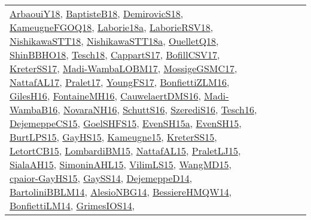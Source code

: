 {\begin{longtable}{lp{3cm}>{\raggedright}p{6cm}>{\raggedright}p{6cm}p{8cm}}
\href{papers/ArbaouiY18.pdf}{ArbaouiY18}\cite{ArbaouiY18}, \href{articles/BaptisteB18.pdf}{BaptisteB18}\cite{BaptisteB18}, \href{papers/DemirovicS18.pdf}{DemirovicS18}\cite{DemirovicS18}, \href{papers/KameugneFGOQ18.pdf}{KameugneFGOQ18}\cite{KameugneFGOQ18}, \href{papers/Laborie18a.pdf}{Laborie18a}\cite{Laborie18a}, \href{articles/LaborieRSV18.pdf}{LaborieRSV18}\cite{LaborieRSV18}, \href{papers/NishikawaSTT18.pdf}{NishikawaSTT18}\cite{NishikawaSTT18}, \href{papers/NishikawaSTT18a.pdf}{NishikawaSTT18a}\cite{NishikawaSTT18a}, \href{papers/OuelletQ18.pdf}{OuelletQ18}\cite{OuelletQ18}, \href{articles/ShinBBHO18.pdf}{ShinBBHO18}\cite{ShinBBHO18}, \href{papers/Tesch18.pdf}{Tesch18}\cite{Tesch18}, \href{papers/CappartS17.pdf}{CappartS17}\cite{CappartS17}, \href{papers/BofillCSV17.pdf}{BofillCSV17}\cite{BofillCSV17}, \href{articles/KreterSS17.pdf}{KreterSS17}\cite{KreterSS17}, \href{papers/Madi-WambaLOBM17.pdf}{Madi-WambaLOBM17}\cite{Madi-WambaLOBM17}, \href{papers/MossigeGSMC17.pdf}{MossigeGSMC17}\cite{MossigeGSMC17}, \href{articles/NattafAL17.pdf}{NattafAL17}\cite{NattafAL17}, \href{papers/Pralet17.pdf}{Pralet17}\cite{Pralet17}, \href{papers/YoungFS17.pdf}{YoungFS17}\cite{YoungFS17}, \href{papers/BonfiettiZLM16.pdf}{BonfiettiZLM16}\cite{BonfiettiZLM16}, \href{papers/GilesH16.pdf}{GilesH16}\cite{GilesH16}, \href{papers/FontaineMH16.pdf}{FontaineMH16}\cite{FontaineMH16}, \href{papers/CauwelaertDMS16.pdf}{CauwelaertDMS16}\cite{CauwelaertDMS16}, \href{papers/Madi-WambaB16.pdf}{Madi-WambaB16}\cite{Madi-WambaB16}, \href{articles/NovaraNH16.pdf}{NovaraNH16}\cite{NovaraNH16}, \href{papers/SchuttS16.pdf}{SchuttS16}\cite{SchuttS16}, \href{papers/SzerediS16.pdf}{SzerediS16}\cite{SzerediS16}, \href{papers/Tesch16.pdf}{Tesch16}\cite{Tesch16}, \href{papers/DejemeppeCS15.pdf}{DejemeppeCS15}\cite{DejemeppeCS15}, \href{articles/GoelSHFS15.pdf}{GoelSHFS15}\cite{GoelSHFS15}, \href{articles/EvenSH15a.pdf}{EvenSH15a}\cite{EvenSH15a}, \href{papers/EvenSH15.pdf}{EvenSH15}\cite{EvenSH15}, \href{papers/BurtLPS15.pdf}{BurtLPS15}\cite{BurtLPS15}, \href{papers/GayHS15.pdf}{GayHS15}\cite{GayHS15}, \href{articles/Kameugne15.pdf}{Kameugne15}\cite{Kameugne15}, \href{papers/KreterSS15.pdf}{KreterSS15}\cite{KreterSS15}, \href{articles/LetortCB15.pdf}{LetortCB15}\cite{LetortCB15}, \href{papers/LombardiBM15.pdf}{LombardiBM15}\cite{LombardiBM15}, \href{articles/NattafAL15.pdf}{NattafAL15}\cite{NattafAL15}, \href{papers/PraletLJ15.pdf}{PraletLJ15}\cite{PraletLJ15}, \href{papers/SialaAH15.pdf}{SialaAH15}\cite{SialaAH15}, \href{articles/SimoninAHL15.pdf}{SimoninAHL15}\cite{SimoninAHL15}, \href{papers/VilimLS15.pdf}{VilimLS15}\cite{VilimLS15}, \href{articles/WangMD15.pdf}{WangMD15}\cite{WangMD15}, \href{papers/cpaior-GayHS15.pdf}{cpaior-GayHS15}\cite{cpaior-GayHS15}, \href{papers/GaySS14.pdf}{GaySS14}\cite{GaySS14}, \href{papers/DejemeppeD14.pdf}{DejemeppeD14}\cite{DejemeppeD14}, \href{papers/BartoliniBBLM14.pdf}{BartoliniBBLM14}\cite{BartoliniBBLM14}, \href{papers/AlesioNBG14.pdf}{AlesioNBG14}\cite{AlesioNBG14}, \href{papers/BessiereHMQW14.pdf}{BessiereHMQW14}\cite{BessiereHMQW14}, \href{papers/BonfiettiLM14.pdf}{BonfiettiLM14}\cite{BonfiettiLM14}, \href{articles/GrimesIOS14.pdf}{GrimesIOS14}\cite{GrimesIOS14}, 
\end{longtable}}

